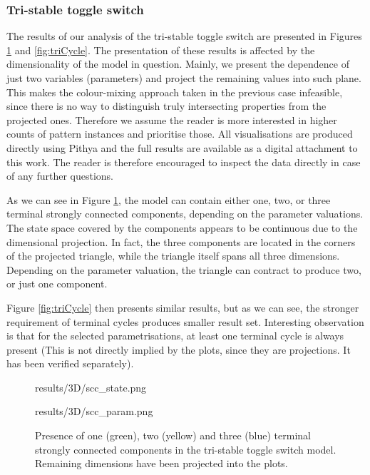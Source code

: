 \subsubsection{\textbf{Tri-stable toggle switch}}

The results of our analysis of the tri-stable toggle switch are presented in Figures \ref{fig:triSCC} and \ref{fig:triCycle}. The presentation of these results is affected by the dimensionality of the model in question. Mainly, we present the dependence of just two variables (parameters) and project the remaining values into such plane. This makes the colour-mixing approach taken in the previous case infeasible, since there is no way to distinguish truly intersecting properties from the projected ones. Therefore we assume the reader is more interested in higher counts of pattern instances and prioritise those. All visualisations are produced directly using Pithya and the full results are available as a digital attachment to this work. The reader is therefore encouraged to inspect the data directly in case of any further questions.

As we can see in Figure \ref{fig:triSCC}, the model can contain either one, two, or three terminal strongly connected components, depending on the parameter valuations. The state space covered by the components appears to be continuous due to the dimensional projection. In fact, the three components are located in the corners of the projected triangle, while the triangle itself spans all three dimensions. Depending on the parameter valuation, the triangle can contract to produce two, or just one component.

Figure \ref{fig:triCycle} then presents similar results, but as we can see, the stronger requirement of terminal cycles produces smaller result set. Interesting observation is that for the selected parametrisations, at least one terminal cycle is always present (This is not directly implied by the plots, since they are projections. It has been verified separately).

\begin{figure}
	
	\begin{center}
		\begin{overpic}[width=.5\textwidth]{results/3D/scc_state.png}\end{overpic}\hfill
		\begin{overpic}[width=.5\textwidth]{results/3D/scc_param.png}\end{overpic}\hfill
	\end{center}
	
	\caption{Presence of one (green), two (yellow) and three (blue) terminal strongly connected components in the tri-stable toggle switch model. Remaining dimensions have been projected into the plots.  }
	\label{fig:triSCC}
\end{figure}

